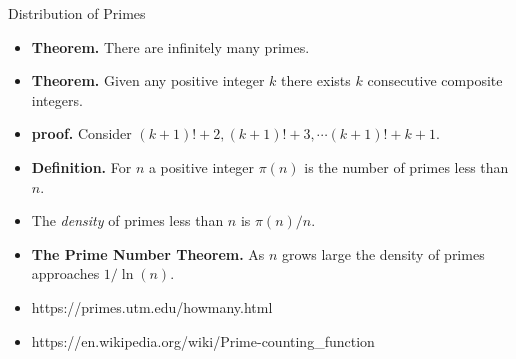 \documentclass{beamer}
\begin{document}
\begin{frame}{Distribution of Primes}

\begin{itemize}
  \item \textbf{Theorem.} There are infinitely many primes.
  \item \textbf{Theorem.} Given any positive integer $k$ there exists $k$
  consecutive composite integers.
  \item \textbf{proof.} Consider $(k+1)! + 2, (k+1)! + 3, \cdots (k+1)! + k + 1$.
  \item \textbf{Definition.} For $n$ a positive integer $\pi(n)$ is the number
  of primes less than $n$.
  \item The \emph{density} of primes less than $n$ is $\pi(n)/n$.
  \item \textbf{The Prime Number Theorem.} As $n$ grows large the density of
  primes approaches $1/\ln(n)$.
  \item https://primes.utm.edu/howmany.html
  \item https://en.wikipedia.org/wiki/Prime-counting\_function
\end{itemize}

\end{frame}
\end{document}
